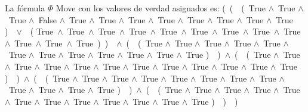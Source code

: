 ﻿\documentclass[a4paper,10pt]{article}
\begin{document}
La fórmula $\Phi$ Move con los valores de verdad asignados es: \newline \newline 
(\ (\ \ (\ True $\wedge$\ True $\wedge$\ True $\wedge$\ False $\wedge$\ True $\wedge$\ True $\wedge$\ True $\wedge$\ True $\wedge$\ True $\wedge$\ True $\wedge$\ True $\wedge$\ True )\ \ $\vee$\ \ ( True\ $\wedge$\ True\ $\wedge$\ True\ $\wedge$\ True\ $\wedge$\ True\ $\wedge$\ True\ $\wedge$\ True\ $\wedge$\ True\ $\wedge$\ True\ $\wedge$\ True\ $\wedge$\ True\ $\wedge$\ True\  )\ )\ \ $\wedge$\ (\ \ (\ True $\wedge$\ True $\wedge$\ True $\wedge$\ True $\wedge$\ True $\wedge$\ True $\wedge$\ True $\wedge$\ True $\wedge$\ True $\wedge$\ True $\wedge$\ True $\wedge$\ True )\ \ )\ $\wedge$\ (\ \ (\ True $\wedge$\ True $\wedge$\ True $\wedge$\ True $\wedge$\ True $\wedge$\ True $\wedge$\ True $\wedge$\ True $\wedge$\ True $\wedge$\ True $\wedge$\ True $\wedge$\ True )\ \ )\ $\wedge$\ (\ \ (\ True $\wedge$\ True $\wedge$\ True $\wedge$\ True $\wedge$\ True $\wedge$\ True $\wedge$\ True $\wedge$\ True $\wedge$\ True $\wedge$\ True $\wedge$\ True $\wedge$\ True )\ \ )\ $\wedge$\ (\ \ (\ True $\wedge$\ True $\wedge$\ True $\wedge$\ True $\wedge$\ True $\wedge$\ True $\wedge$\ True $\wedge$\ True $\wedge$\ True $\wedge$\ True $\wedge$\ True $\wedge$\ True )\ \ )\ \ )\  \newline \newline 
\end{document}
